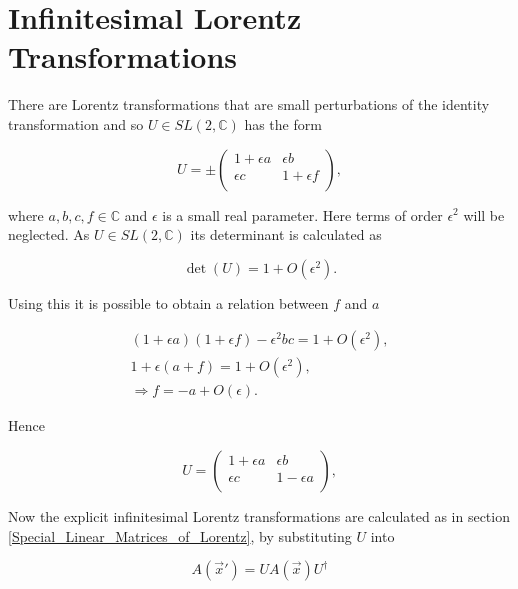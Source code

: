 \section{Infinitesimal Lorentz Transformations}

There are Lorentz transformations that are small perturbations of the identity transformation and so $U \in SL(2,\mathbb{C})$ has the form

\begin{equation*}
U = \pm
\left(
\begin{array}{cc}
1 + \epsilon a & \epsilon b \\
\epsilon c & 1 + \epsilon f \\
\end{array}
\right),
\end{equation*}

\noindent where $a,b,c,f \in \mathbb{C}$ and $\epsilon$ is a small real parameter. Here terms of order $\epsilon^2$ will be neglected. As $U \in SL(2,\mathbb{C})$ its determinant is calculated as

\begin{equation*}
\det{(U)} = 1 + O(\epsilon^2).
\end{equation*}

\noindent Using this it is possible to obtain a relation between $f$ and $a$

\begin{eqnarray*}
(1 + \epsilon a)(1 + \epsilon f) - \epsilon^2 b c = 1 + O(\epsilon^2), \\
1 + \epsilon (a +f) = 1 + O(\epsilon^2), \\
\Rightarrow f = -a + O(\epsilon).
\end{eqnarray*}

\noindent Hence 

\begin{equation*}
U =
\left(
\begin{array}{cc}
1 + \epsilon a & \epsilon b \\
\epsilon c & 1 - \epsilon a \\
\end{array}
\right),
\end{equation*}

Now the explicit infinitesimal Lorentz transformations are calculated as in section \ref{Special_Linear_Matrices_of_Lorentz}, by substituting $U$ into

\begin{equation*}
A(\vec{x}') = U A(\vec{x}) U^{\dagger}
\end{equation*}


